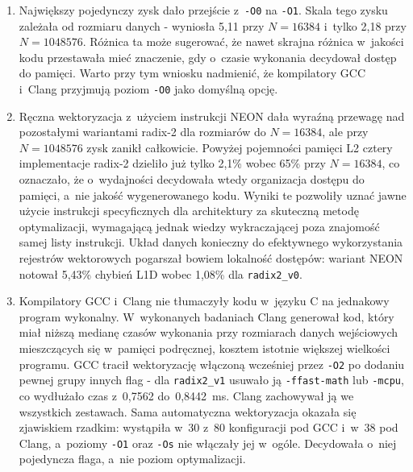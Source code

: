 \begin{enumerate}
    \item Największy pojedynczy zysk dało przejście z~\texttt{-O0} na
          \texttt{-O1}. Skala tego zysku zależała od rozmiaru danych - wyniosła
          5,11 przy $N=16384$ i~tylko 2,18 przy $N=1048576$. Różnica ta może
          sugerować, że nawet skrajna różnica w~jakości kodu przestawała mieć
          znaczenie, gdy o~czasie wykonania decydował dostęp do pamięci. Warto
          przy tym wniosku nadmienić, że kompilatory GCC i~Clang przyjmują poziom
          \texttt{-O0} jako domyślną opcję.

    \item Ręczna wektoryzacja z~użyciem instrukcji NEON dała wyraźną przewagę nad
          pozostałymi wariantami radix-2 dla rozmiarów do $N=16384$, ale przy
          $N=1048576$ zysk zanikł całkowicie. Powyżej pojemności pamięci L2
          cztery implementacje radix-2 dzieliło już tylko 2,1\% wobec 65\% przy
          $N=16384$, co oznaczało, że o~wydajności decydowała wtedy organizacja
          dostępu do pamięci, a~nie jakość wygenerowanego kodu. Wyniki te
          pozwoliły uznać jawne użycie instrukcji specyficznych dla architektury
          za skuteczną metodę optymalizacji, wymagającą jednak wiedzy
          wykraczającej poza znajomość samej listy instrukcji. Układ danych
          konieczny do efektywnego wykorzystania rejestrów wektorowych pogarszał
          bowiem lokalność dostępów: wariant NEON notował 5,43\% chybień L1D
          wobec 1,08\% dla \texttt{radix2\_v0}.

    \item Kompilatory GCC i~Clang nie tłumaczyły kodu w~języku C na jednakowy
          program wykonalny. W~wykonanych badaniach Clang generował kod, który
          miał niższą medianę czasów wykonania przy rozmiarach danych wejściowych
          mieszczących się w~pamięci podręcznej, kosztem istotnie większej
          wielkości programu. GCC tracił wektoryzację włączoną wcześniej przez
          \texttt{-O2} po dodaniu pewnej grupy innych flag - dla
          \texttt{radix2\_v1} usuwało ją \texttt{-ffast-math} lub \texttt{-mcpu},
          co wydłużało czas z~0,7562 do~0,8442~ms. Clang zachowywał ją we
          wszystkich zestawach. Sama automatyczna wektoryzacja okazała się
          zjawiskiem rzadkim: wystąpiła w~30 z~80 konfiguracji pod GCC i~w~38 pod
          Clang, a~poziomy \texttt{-O1} oraz \texttt{-Os} nie włączały jej
          w~ogóle. Decydowała o~niej pojedyncza flaga, a~nie poziom optymalizacji.


\end{enumerate}
